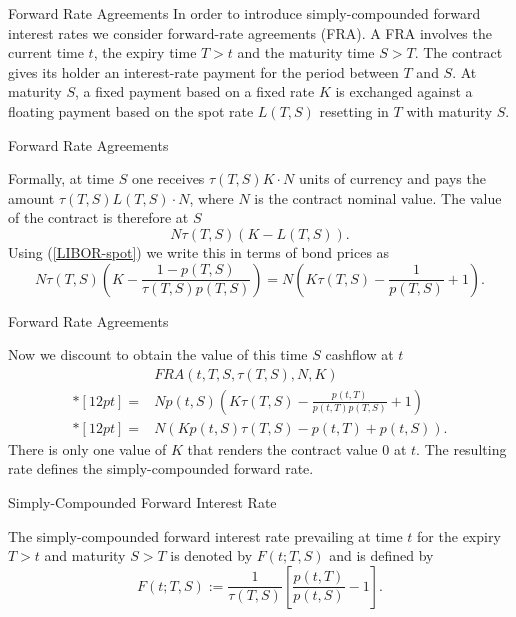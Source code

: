 

{Forward Rate Agreements}
In order to introduce simply-compounded forward interest rates we
consider forward-rate agreements (FRA). A FRA involves the current
time $t$, the expiry time $T>t$ and the maturity time $S>T$. The
contract gives its holder an interest-rate payment for the period
between $T$ and $S$. At maturity $S$, a fixed payment based on a
fixed rate $K$ is exchanged against a floating payment based on
the spot rate $L(T,S)$ resetting in $T$ with maturity $S$.

{Forward Rate Agreements}

Formally, at time $S$ one receives $\tau(T,S)K\cdot N$ units of
currency and pays the amount $\tau(T,S)L(T,S)\cdot N$, where $N$
is the contract nominal value. The value of the contract is
therefore at $S$
\begin{equation}\label{FRA-1}
N\tau(T,S)(K-L(T,S)).
\end{equation}
Using (\ref{LIBOR-spot})
we write this in terms of bond prices as
$$
N\tau(T,S)\left(K-\frac{1-p(T,S)}{\tau(T,S)p(T,S)}\right)=N\left(K\tau(T,S)-\frac{1}{p(T,S)}+1\right).
$$

{Forward Rate Agreements}

Now we discount to obtain the value of this time $S$ cashflow at
$t$
$$
\begin{array}{ll}
& FRA(t,T,S,\tau(T,S),N,K) \\*[12pt] = & Np(t,S)\left(K\tau(T,S)-\frac{p(t,T)}{p(t,T)p(T,S)}+1\right) \\*[12pt]
  = &N(K p(t,S)\tau(T,S)-p(t,T)+p(t,S)).
\end{array}
$$
There is only one value of $K$ that renders the contract value $0$
at $t$. The resulting rate defines the simply-compounded forward
rate.

{Simply-Compounded Forward Interest Rate}

The simply-compounded forward interest rate prevailing at time $t$
for the expiry $T>t$ and maturity $S>T$ is denoted by $F(t;T,S)$
and is defined by
\begin{equation}
F(t;T,S):=\frac{1}{\tau(T,S)} \left[\frac{p(t,T)}{p(t,S)}-1\right].
\end{equation}

